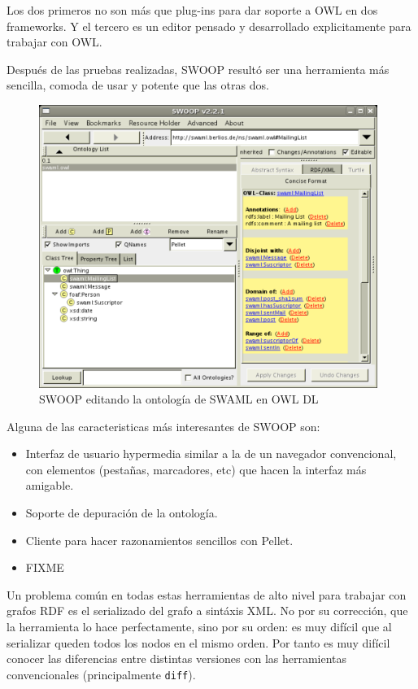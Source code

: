 Los dos primeros no son más que plug-ins para dar soporte a OWL en dos 
frameworks. Y el tercero es un editor pensado y desarrollado explicitamente
para trabajar con OWL.

Después de las pruebas realizadas, SWOOP resultó ser una herramienta más sencilla,
comoda de usar y potente que las otras dos.

\begin{figure}[ht]
	\centering
	\includegraphics[width=11cm]{images/swoop.png}
	\caption{SWOOP editando la ontología de SWAML en OWL DL}
	\label{fig:evoWeb}
\end{figure}

Alguna de las caracteristicas más interesantes de SWOOP son:

\begin{itemize}
  \item Interfaz de usuario hypermedia similar a la de un navegador convencional, 
	con elementos (pestañas, marcadores, etc) que hacen la interfaz más 
	amigable.
  \item Soporte de depuración de la ontología.
  \item Cliente para hacer razonamientos sencillos con Pellet.
  \item FIXME
\end{itemize}

Un problema común en todas estas herramientas de alto nivel para trabajar con
grafos RDF es el serializado del grafo a sintáxis XML. No por su corrección,
que la herramienta lo hace perfectamente, sino por su orden: es muy difícil
que al serializar queden todos los nodos en el mismo orden. Por tanto es muy
difícil conocer las diferencias entre distintas versiones con las herramientas
convencionales (principalmente \texttt{diff}).

